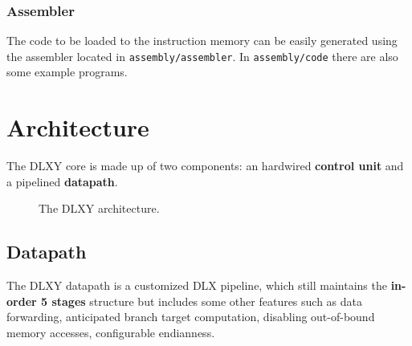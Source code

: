 \subsubsection{Assembler}
The code to be loaded to the instruction memory can be easily generated using
the assembler located in \texttt{assembly/assembler}.
In \texttt{assembly/code} there are also some example programs.

\section{Architecture}
The DLXY core is made up of two components: an hardwired \textbf{control unit}
and a pipelined \textbf{datapath}.

\begin{figure}[H]
	\centering
	\caption{The DLXY architecture.}
	\label{fig:architecture}
\end{figure}

\subsection{Datapath}
The DLXY datapath is a customized DLX pipeline, which still maintains the
\textbf{in-order 5 stages} structure but includes some other features such as
data forwarding, anticipated branch target computation, disabling out-of-bound
memory accesses, configurable endianness.

